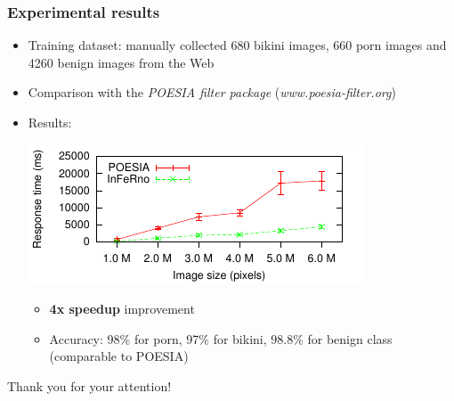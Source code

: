 \documentclass{beamer}
\begin{document}
\begin{frame}
\frametitle{Experimental results}
	\begin{itemize}

		\item Training dataset: manually collected 680 bikini images, 
		      660 porn images and 4260 benign images from the Web

		\item Comparison with the {\em POESIA filter package}  ({\em www.poesia-filter.org})

		\item Results:
	          \begin{center}
		             \includegraphics[scale=1.3]{images/scatter-p-t-all-bars.pdf}
	          \end{center}
			  \begin{itemize}
	                \item \textbf{4x speedup} improvement 
                    \item Accuracy: 98\% for porn, 97\% for bikini, 98.8\% for benign class (comparable to POESIA)
	          \end{itemize}
	\end{itemize}
\end{frame}

\begin{frame}
	\centerline{Thank you for your attention! \smiley}
\end{frame}
\end{document}
